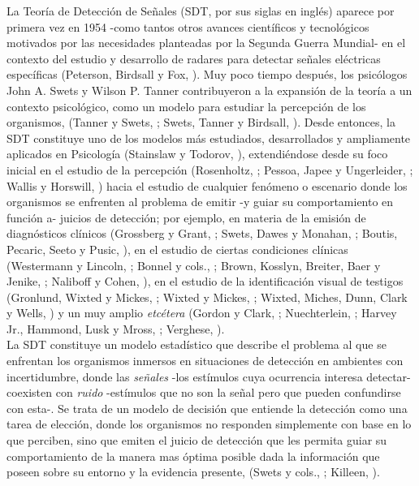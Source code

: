 La Teoría de Detección de Señales (SDT, por sus siglas en inglés) aparece por primera vez en 1954 -como tantos otros avances científicos y tecnológicos motivados por las necesidades planteadas por la Segunda Guerra Mundial- en el contexto del estudio y desarrollo de radares para detectar señales eléctricas específicas (Peterson, Birdsall y Fox, \citeyear{Peterson1954}). Muy poco tiempo después, los psicólogos John A. Swets y Wilson P. Tanner contribuyeron a la expansión de la teoría a un contexto psicológico, como un modelo para estudiar la percepción de los organismos, (Tanner y Swets, \citeyear{Tanner1954}; Swets, Tanner y Birdsall, \citeyear{Swets1961}). Desde entonces, la SDT constituye uno de los modelos más estudiados, desarrollados y ampliamente aplicados en Psicología (Stainslaw y Todorov, \citeyear{Stainslaw1999}), extendiéndose desde su foco inicial en el estudio de la percepción (Rosenholtz, \citeyear{Rosenholtz2001}; Pessoa, Japee y Ungerleider, \citeyear{Pessoa2005}; Wallis y Horswill, \citeyear{Wallis2007}) hacia el estudio de cualquier fenómeno o escenario donde los organismos se enfrenten al problema de emitir -y guiar su comportamiento en función a- juicios de detección; por ejemplo, en materia de la emisión de diagnósticos clínicos (Grossberg y Grant, \citeyear{Grossberg1978}; Swets, Dawes y Monahan, \citeyear{Swets2000}; Boutis, Pecaric, Seeto y Pusic, \citeyear{Boutis2010}), en el estudio de ciertas condiciones clínicas (Westermann y Lincoln, \citeyear{Westermann2010}; Bonnel y cols., \citeyear{Bonnel2003}; Brown, Kosslyn, Breiter, Baer y Jenike, \citeyear{Brown1994}; Naliboff y Cohen, \citeyear{Naliboff1981}), en el estudio de la identificación visual de testigos (Gronlund, Wixted y Mickes, \citeyear{Gronlund2014}; Wixted y Mickes, \citeyear{Wixted2014}; Wixted, Miches, Dunn, Clark y Wells, \citeyear{Wixted2016}) y un muy amplio \textit{etcétera} (Gordon y Clark, \citeyear{Gordon1974}; Nuechterlein, \citeyear{Nuechterlein1983}; Harvey Jr., Hammond, Lusk y Mross, \citeyear{Harvey1992}; Verghese, \citeyear{Verghese2001}).\\ 

La SDT constituye un modelo estadístico que describe el problema al que se enfrentan los organismos inmersos en situaciones de detección en ambientes con incertidumbre, donde las \textit{señales} -los estímulos cuya ocurrencia interesa detectar- coexisten con \textit{ruido} -estímulos que no son la señal pero que pueden confundirse con esta-. Se trata de un modelo de decisión que entiende la detección como una tarea de elección, donde los organismos no responden simplemente con base en lo que perciben, sino que emiten el juicio de detección que les permita guiar su comportamiento de la manera mas óptima posible dada la información que poseen sobre su entorno y la evidencia presente, (Swets y cols., \citeyear{Swets2000}; Killeen, \citeyear{Killeen2014}).\\

